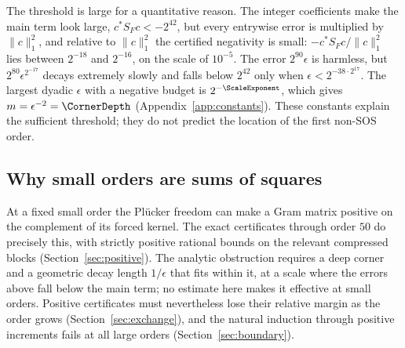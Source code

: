 The threshold is large for a quantitative reason. The integer
coefficients make the main term look large, $c^*S_Fc<-2^{42}$, but every
entrywise error is multiplied by $\|c\|_1^2$, and relative to $\|c\|_1^2$
the certified negativity is small: $-c^*S_Fc/\|c\|_1^2$ lies between
$2^{-18}$ and $2^{-16}$, on the scale of $10^{-5}$. The error
$2^{90}\epsilon$ is harmless, but $2^{80}\epsilon^{2^{-17}}$ decays
extremely slowly and falls below $2^{42}$ only when
$\epsilon<2^{-38\cdot2^{17}}$. The largest dyadic $\epsilon$ with a
negative budget is $2^{-\ScaleExponent}$, which gives
$m=\epsilon^{-2}=\CornerDepth$ (Appendix~\ref{app:constants}). These
constants explain the sufficient threshold; they do not predict the
location of the first non-SOS order.

\subsection{Why small orders are sums of squares}\label{sec:mech-small}
At a fixed small order the Pl\"ucker freedom can make a Gram matrix
positive on the complement of its forced kernel. The exact certificates
through order $50$ do precisely this, with strictly positive rational
bounds on the relevant compressed blocks (Section~\ref{sec:positive}).
The analytic obstruction requires a deep corner and a geometric decay
length $1/\epsilon$ that fits within it, at a scale where the errors
above fall below the main term; no estimate here makes it effective at
small orders. Positive certificates must nevertheless
lose their relative margin as the order grows
(Section~\ref{sec:exchange}), and the natural induction through positive
increments fails at all large orders (Section~\ref{sec:boundary}).
